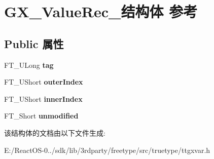 \hypertarget{struct_g_x___value_rec__}{}\section{G\+X\+\_\+\+Value\+Rec\+\_\+结构体 参考}
\label{struct_g_x___value_rec__}
\subsection*{Public 属性}
\begin{DoxyCompactItemize}
\item 
\mbox{\label{struct_g_x___value_rec___af93c981f9888caaabdc38c5f21614c46}} 
F\+T\+\_\+\+U\+Long {\bfseries tag}
\item 
\mbox{\label{struct_g_x___value_rec___a5ab998ba708fbbc93ec1b143355388f2}} 
F\+T\+\_\+\+U\+Short {\bfseries outer\+Index}
\item 
\mbox{\label{struct_g_x___value_rec___a028c501ed75599b0659364abf52b9332}} 
F\+T\+\_\+\+U\+Short {\bfseries inner\+Index}
\item 
\mbox{\label{struct_g_x___value_rec___a50777a184b2b067b4e59b45e3a33e043}} 
F\+T\+\_\+\+Short {\bfseries unmodified}
\end{DoxyCompactItemize}


该结构体的文档由以下文件生成\+:\begin{DoxyCompactItemize}
\item 
E\+:/\+React\+O\+S-\/0../sdk/lib/3rdparty/freetype/src/truetype/ttgxvar.\+h\end{DoxyCompactItemize}
